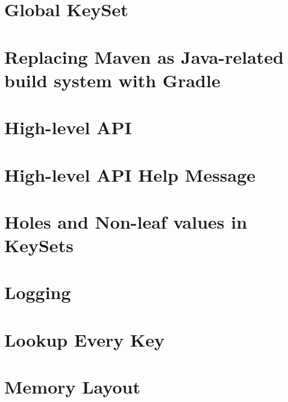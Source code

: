 \let\mypdfximage\pdfximage\def\pdfximage{\immediate\mypdfximage}\documentclass[twoside]{book}
\newcommand{\+}{\discretionary{\mbox{\scriptsize$\hookleftarrow$}}{}{}}
\begin{document}
\chapter{Global Key\+Set}
\label{doc_decisions_6_implemented_global_keyset_md}

\chapter{Replacing Maven as Java-\/related build system with Gradle}
\label{doc_decisions_6_implemented_gradle_md}

\chapter{High-\/level API}
\label{doc_decisions_6_implemented_high_level_api_md}

\chapter{High-\/level API Help Message}
\label{doc_decisions_6_implemented_highlevel_help_message_md}

\chapter{Holes and Non-\/leaf values in Key\+Sets}
\label{doc_decisions_6_implemented_holes_md}

\chapter{Logging}
\label{doc_decisions_6_implemented_logging_md}

\chapter{Lookup Every Key}
\label{doc_decisions_6_implemented_lookup_every_key_md}

\chapter{Memory Layout}
\label{doc_decisions_6_implemented_memory_layout_md}

\end{document}
